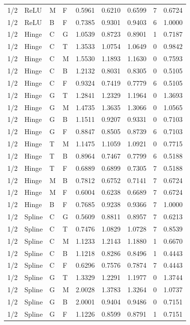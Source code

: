 \begin{longtable}{llllrrrrr}
1/2 & ReLU & M & F & 0.5961 & 0.6210 & 0.6599 & 7 & 0.6724 \\
1/2 & ReLU & B & F & 0.7385 & 0.9301 & 0.9403 & 6 & 1.0000 \\
1/2 & Hinge & C & G & 1.0539 & 0.8723 & 0.8901 & 1 & 0.7187 \\
1/2 & Hinge & C & T & 1.3533 & 1.0754 & 1.0649 & 0 & 0.9842 \\
1/2 & Hinge & C & M & 1.5530 & 1.1893 & 1.1630 & 0 & 0.7593 \\
1/2 & Hinge & C & B & 1.2132 & 0.8031 & 0.8305 & 0 & 0.5105 \\
1/2 & Hinge & C & F & 0.9324 & 0.7419 & 0.7779 & 6 & 0.5105 \\
1/2 & Hinge & G & T & 1.2841 & 1.2329 & 1.1964 & 0 & 1.3693 \\
1/2 & Hinge & G & M & 1.4735 & 1.3635 & 1.3066 & 0 & 1.0565 \\
1/2 & Hinge & G & B & 1.1511 & 0.9207 & 0.9331 & 0 & 0.7103 \\
1/2 & Hinge & G & F & 0.8847 & 0.8505 & 0.8739 & 6 & 0.7103 \\
1/2 & Hinge & T & M & 1.1475 & 1.1059 & 1.0921 & 0 & 0.7715 \\
1/2 & Hinge & T & B & 0.8964 & 0.7467 & 0.7799 & 6 & 0.5188 \\
1/2 & Hinge & T & F & 0.6889 & 0.6899 & 0.7305 & 7 & 0.5188 \\
1/2 & Hinge & M & B & 0.7812 & 0.6752 & 0.7141 & 7 & 0.6724 \\
1/2 & Hinge & M & F & 0.6004 & 0.6238 & 0.6689 & 7 & 0.6724 \\
1/2 & Hinge & B & F & 0.7685 & 0.9238 & 0.9366 & 7 & 1.0000 \\
1/2 & Spline & C & G & 0.5609 & 0.8811 & 0.8957 & 7 & 0.6213 \\
1/2 & Spline & C & T & 0.7476 & 1.0829 & 1.0728 & 7 & 0.8539 \\
1/2 & Spline & C & M & 1.1233 & 1.2143 & 1.1880 & 1 & 0.6670 \\
1/2 & Spline & C & B & 1.1218 & 0.8286 & 0.8496 & 1 & 0.4443 \\
1/2 & Spline & C & F & 0.6296 & 0.7576 & 0.7874 & 7 & 0.4443 \\
1/2 & Spline & G & T & 1.3329 & 1.2291 & 1.1977 & 0 & 1.3744 \\
1/2 & Spline & G & M & 2.0028 & 1.3783 & 1.3264 & 0 & 1.0737 \\
1/2 & Spline & G & B & 2.0001 & 0.9404 & 0.9486 & 0 & 0.7151 \\
1/2 & Spline & G & F & 1.1226 & 0.8599 & 0.8791 & 1 & 0.7151 \\

\end{longtable}
